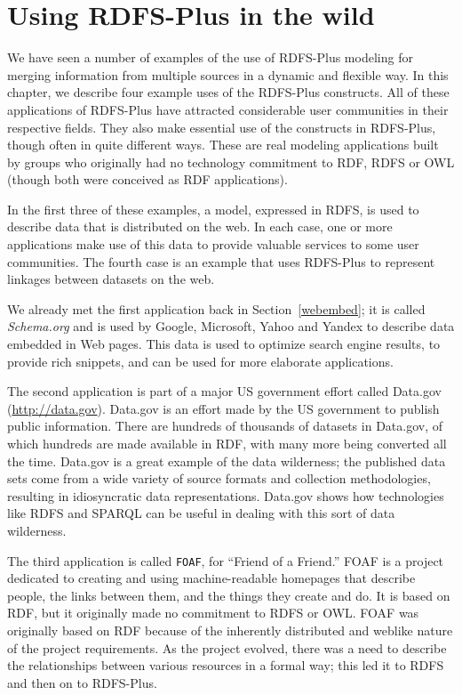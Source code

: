 \chapter{Using RDFS-Plus in the wild}
\label{ch10}

We have seen a number of examples of the use of RDFS-Plus modeling for
merging information from multiple sources in a dynamic and flexible way.
In this chapter, we describe four  example uses of the RDFS-Plus
constructs. All of these applications of RDFS-Plus have attracted
considerable user communities in their respective fields. They
also make essential use of the constructs in RDFS-Plus, though often in
quite different ways. These are real modeling applications built by
groups who originally had no technology commitment to RDF, RDFS or OWL
(though both were conceived as RDF applications).

In the first three of these examples, a model, expressed in RDFS, is used to describe
data that is distributed on the web.  In each case, one or more applications
make use of this data to provide valuable services to some user communities.  
The fourth case is an example that uses RDFS-Plus to represent linkages between datasets
on the web. 



We already met the first application back in Section~\ref{webembed}; it is 
called \emph{Schema.org} and is used by Google, Microsoft, Yahoo and Yandex 
to describe data embedded in Web pages.  This data is used to optimize search
engine results, to provide rich snippets, and can be used for more elaborate 
applications. 

The second application is part of a major US government effort called
Data.gov (\url{http://data.gov}). Data.gov is an effort made by the US
government to publish public information. There are hundreds of
thousands of datasets in Data.gov, of which hundreds are made available
in RDF, with many more being converted all the time. Data.gov is a great
example of the data wilderness; the published data sets
come from a wide variety of source formats and collection methodologies,
resulting in idiosyncratic data representations. Data.gov shows how
technologies like RDFS and SPARQL can be useful in dealing with this
sort of data wilderness.

The third application is called \texttt{FOAF}, for ``Friend of a Friend.'' FOAF
is a project dedicated to creating and using machine-readable homepages
that describe people, the links between them, and the things they create
and do. It is based on RDF, but it originally made no commitment to RDFS
or OWL.
FOAF was originally based on RDF because of the inherently distributed
and weblike nature of the 
project requirements. As the project evolved, there was a need to
describe the relationships between various resources in a formal way;
this led it to RDFS and then on to RDFS-Plus.

